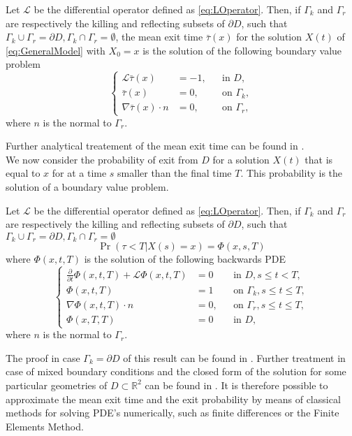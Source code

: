 \begin{theorem} Let $\mathcal L$ be the differential operator defined as \eqref{eq:LOperator}. Then, if $\Gamma_k$ and $\Gamma_r$ are respectively the killing and reflecting subsets of $\partial D$, such that $\Gamma_k \cup \Gamma_r = \partial D, \Gamma_k \cap \Gamma_r = \emptyset$, the mean exit time $\bar \tau(x)$ for the solution $X(t)$ of \eqref{eq:GeneralModel} with $X_0 = x$ is the solution of the following boundary value problem
\begin{equation}\label{eq:PDETau}
\left \{
\begin{aligned}
	\mathcal L \bar \tau(x) &= -1, && \text{in } D, \\
	\bar\tau(x) &= 0, && \text{on } \Gamma_k, \\
	\nabla \bar\tau(x) \cdot n &= 0, && \text{on } \Gamma_r,
\end{aligned} \right .
\end{equation}
where $n$ is the normal to $\Gamma_r$.
\end{theorem}
\noindent Further analytical treatement of the mean exit time can be found in \cite{Krumscheid2015,Pavliotis2014}. \\
We now consider the probability of exit from $D$ for a solution $X(t)$ that is equal to $x$ for at a time $s$ smaller than the final time $T$. This probability is the solution of a boundary value problem.
\begin{theorem} Let $\mathcal L$ be the differential operator defined as \eqref{eq:LOperator}. Then, if $\Gamma_k$ and $\Gamma_r$ are respectively the killing and reflecting subsets of $\partial D$, such that $\Gamma_k \cup \Gamma_r = \partial D, \Gamma_k \cap \Gamma_r = \emptyset$
\begin{equation}\label{eq:ExitProbNotation}
	\Pr(\tau < T | X(s) = x) = \Phi(x,s,T) 
\end{equation}
where $\Phi(x,t,T)$ is the solution of the following backwards PDE
\begin{equation}\label{eq:PDEPhi}
\left \{
\begin{aligned}
	\frac{\partial}{\partial t} \Phi(x,t,T) + \mathcal L \Phi(x,t,T) &= 0 && \text{in } D, s \leq t < T, \\
	\Phi(x,t,T) &= 1 && \text{on } \Gamma_k, s \leq t \leq T,\\
	\nabla \Phi(x,t,T) \cdot n &= 0, && \text{on } \Gamma_r, s \leq t \leq T, \\
	\Phi(x,T,T) &= 0 && \text{in } D,
\end{aligned} \right .
\end{equation}
where $n$ is the normal to $\Gamma_r$.
\end{theorem}
\noindent The proof in case $\Gamma_k = \partial D$ of this result can be found in \cite{Sirovich2010}. Further treatment in case of mixed boundary conditions and the closed form of the solution for some particular geometries of $D \subset \mathbb{R}^2$ can be found in \cite{Grebenkov2014}. It is therefore possible to approximate the mean exit time and the exit probability by means of classical methods for solving PDE's numerically, such as finite differences or the Finite Elements Method.

